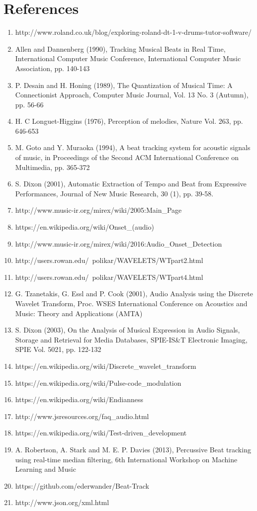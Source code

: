 \documentclass[a4paper, 11pt]{article}
\begin{document}
\maketitle{} 
\section{References}
\begin{enumerate}
\item http://www.roland.co.uk/blog/exploring-roland-dt-1-v-drums-tutor-software/
\item Allen and Dannenberg (1990), Tracking Musical Beats in Real Time, International Computer Music Conference, International Computer Music Association, pp. 140-143
\item P. Desain and H. Honing (1989), The Quantization of Musical Time: A Connectionist Approach, Computer Music Journal, Vol. 13 No. 3 (Autumn), pp. 56-66
\item H. C Longuet-Higgins (1976), Perception of melodies, Nature Vol. 263, pp. 646-653
\item M. Goto and Y. Muraoka (1994), A beat tracking system for acoustic signals of music, in Proceedings of the Second ACM International Conference on Multimedia, pp. 365-372
\item S. Dixon (2001), Automatic Extraction of Tempo and Beat from Expressive Performances, Journal of New Music Research, 30 (1), pp. 39-58.
\item http://www.music-ir.org/mirex/wiki/2005:Main\_Page
\item https://en.wikipedia.org/wiki/Onset\_(audio)
\item http://www.music-ir.org/mirex/wiki/2016:Audio\_Onset\_Detection
\item http://users.rowan.edu/~polikar/WAVELETS/WTpart2.html
\item http://users.rowan.edu/~polikar/WAVELETS/WTpart4.html
\item G. Tzanetakis, G. Essl and P. Cook (2001), Audio Analysis using the Discrete Wavelet Transform, Proc. WSES International Conference on Acoustics and Music: Theory and Applications (AMTA)
\item S. Dixon (2003), On the Analysis of Musical Expression in Audio Signals, Storage and Retrieval for Media Databases, SPIE-IS\&T Electronic Imaging, SPIE Vol. 5021, pp. 122-132
\item https://en.wikipedia.org/wiki/Discrete\_wavelet\_transform
\item https://en.wikipedia.org/wiki/Pulse-code\_modulation
\item https://en.wikipedia.org/wiki/Endianness
\item http://www.jsresources.org/faq\_audio.html
\item https://en.wikipedia.org/wiki/Test-driven\_development
\item A. Robertson, A. Stark and M. E. P. Davies (2013), Percussive Beat tracking using real-time median filtering, 6th International Workshop on Machine Learning and Music
\item https://github.com/ederwander/Beat-Track
\item http://www.json.org/xml.html
\end{enumerate}
\end{document}
